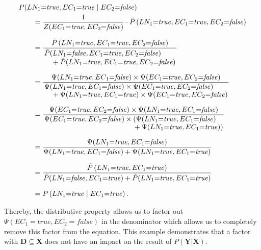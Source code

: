 \begin{equation*}
\begin{split}
  &P(LN_1{=}\mathit{true},EC_1{=}\mathit{true}\mid EC_2{=}\mathit{false})\\
  &\hspace{2em}=\frac{1}{Z(EC_1{=}\mathit{true},EC_2{=}\mathit{false})}\cdot\tilde{P}\left(LN_1{=}\mathit{true},EC_1{=}\mathit{true},EC_2{=}\mathit{false}\right)\\[0.25cm]
  &\hspace{2em}=\frac{\tilde{P}\left(LN_1{=}\mathit{true},EC_1{=}\mathit{true},EC_2{=}\mathit{false}\right)}{\splitfrac{\tilde{P}(LN_1{=}\mathit{false},EC_1{=}\mathit{true},EC_2{=}\mathit{false})}
    {+\tilde{P}(LN_1{=}\mathit{true},EC_1{=}\mathit{true},EC_2{=}\mathit{false})}}\\[0.25cm]
  &\hspace{2em}=\frac{\Psi(LN_1{=}\mathit{true},EC_1{=}\mathit{false})\times\Psi(EC_1{=}\mathit{true},EC_2{=}\mathit{false})}{\splitfrac{\Psi(LN_1{=}\mathit{true},EC_1{=}\mathit{false})\times\Psi(EC_1{=}\mathit{true},EC_2{=}\mathit{false})}
  {+\Psi(LN_1{=}\mathit{true},EC_1{=}\mathit{true})\times\Psi(EC_1{=}\mathit{true},EC_2{=}\mathit{false})}}\\[0.25cm]
  &\hspace{2em}=\frac{\Psi(EC_1{=}\mathit{true},EC_2{=}\mathit{false})\times\Psi(LN_1{=}\mathit{true},EC_1{=}\mathit{false})}{\splitfrac{\Psi(EC_1{=}\mathit{true},EC_2{=}\mathit{false})\times(\Psi(LN_1{=}\mathit{true},EC_1{=}\mathit{false})}
  {+\Psi(LN_1{=}\mathit{true},EC_1{=}\mathit{true}))}}\\[0.25cm]
  &\hspace{2em}=\frac{\Psi(LN_1{=}\mathit{true},EC_1{=}\mathit{false})}{\Psi(LN_1{=}\mathit{true},EC_1{=}\mathit{false})+\Psi(LN_1{=}\mathit{true},EC_1{=}\mathit{true})}\\[0.25cm]
  &\hspace{2em}=\frac{\tilde{P}\left(LN_1{=}\mathit{true},EC_1{=}\mathit{true}\right)}{\tilde{P}(LN_1{=}\mathit{false},EC_1{=}\mathit{true})+\tilde{P}(LN_1{=}\mathit{true},EC_1{=}\mathit{true})}\\[0.25cm]
  &\hspace{2em}={P}\left(LN_1{=}\mathit{true}\mid EC_1{=}\mathit{true}\right).\\
\end{split}
\end{equation*}

Thereby, the distributive property allows us to factor out $\Psi(EC_1{=}\mathit{true},EC_2{=}\mathit{false})$ in the denominator which allows us to completely remove this \gls{factor} from the equation.
This example demonstrates that a \gls{factor} with $\mathbf{D}\subseteq\mathbf{X}$ does not have an impact on the result of $P(\mathbf{Y}|\mathbf{X})$.

